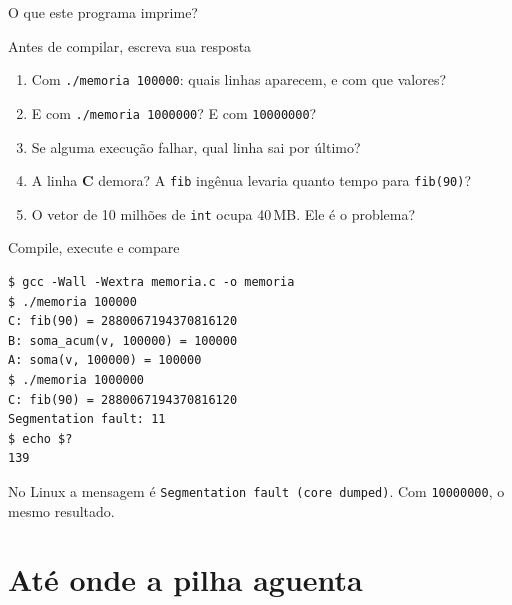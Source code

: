 \documentclass[aspectratio=169]{beamer}
\begin{document}
\begin{frame}{O que este programa imprime?}
  \begin{block}{Antes de compilar, escreva sua resposta}
    \begin{enumerate}
      \item Com \texttt{./memoria 100000}: quais linhas aparecem, e com que
        valores?
      \item E com \texttt{./memoria 1000000}? E com \texttt{10000000}?
      \item Se alguma execução falhar, qual linha sai por último?
      \item A linha \textbf{C} demora? A \texttt{fib} ingênua levaria quanto
        tempo para \texttt{fib(90)}?
      \item O vetor de 10 milhões de \texttt{int} ocupa 40\,MB. Ele é o
        problema?
    \end{enumerate}
  \end{block}
\end{frame}

\begin{frame}[fragile]{Compile, execute e compare}
\begin{lstlisting}[style=shellStyle]
$ gcc -Wall -Wextra memoria.c -o memoria
$ ./memoria 100000
C: fib(90) = 2880067194370816120
B: soma_acum(v, 100000) = 100000
A: soma(v, 100000) = 100000
$ ./memoria 1000000
C: fib(90) = 2880067194370816120
Segmentation fault: 11
$ echo $?
139
\end{lstlisting}
  \begin{center}
    \scriptsize\textcolor{UFSGray}{No Linux a mensagem é
    \texttt{Segmentation fault (core dumped)}. Com \texttt{10000000}, o mesmo
    resultado.}
  \end{center}
\end{frame}

\section{Até onde a pilha aguenta}
\end{document}
